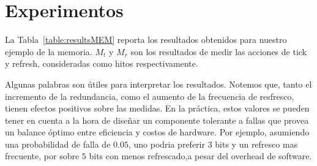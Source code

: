 \section{Experimentos}
\label{sec:experimental_eval_prob}
La Tabla~\ref{table:resultsMEM} reporta los resultados obtenidos para nuestro ejemplo de la memoria.
$M_{t}$ y $M_{r}$ son los resultados de medir las acciones de tick y refresh, consideradas como hitos respectivamente.

Algunas palabras son útiles para interpretar los resultados. Notemos que, tanto el incremento de la redundancia, como el aumento de la frecuencia de resfresco, tienen efectos positivos sobre las medidas. En la práctica, estos valores se pueden tener en cuenta a la hora de diseñar un componente tolerante a fallas que provea un balance óptimo entre eficiencia y costos de hardware. Por ejemplo, asumiendo una probabilidad de falla de $0.05$, uno podria preferir $3$ bits y un refresco mas frecuente, por sobre $5$ bits con menos refrescado,a pesar del overhead de software.


